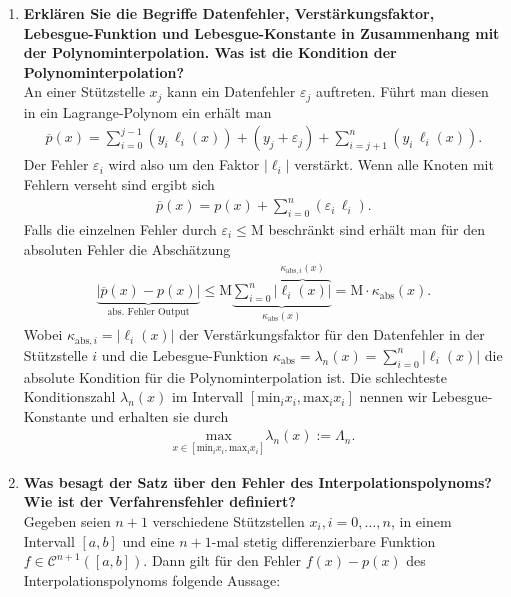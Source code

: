 \begin{enumerate}
		\item \textbf{Erklären Sie die Begriffe Datenfehler, Verstärkungsfaktor, Lebesgue-Funktion und Lebesgue-Konstante in Zusammenhang mit der Polynominterpolation. Was ist die Kondition der Polynominterpolation?} \\
			An einer Stützstelle \(x_j\) kann ein Datenfehler \(\varepsilon_j\) auftreten.
			Führt man diesen in ein Lagrange-Polynom ein erhält man
			\begin{align*}
				\overline{p}(x)=\sum_{i=0}^{j-1}\left( y_i\,\ell_i(x)\right) + (y_j+\varepsilon_j)+\sum_{i=j+1}^{n}\left( y_i\,\ell_i(x)\right).
			\end{align*}
			Der Fehler \(\varepsilon_i\) wird also um den Faktor \(|\ell_i|\) verstärkt.
			Wenn alle Knoten mit Fehlern verseht sind ergibt sich
			\begin{align*}
				\overline{p}(x)=p(x)+\sum_{i=0}^{n}\left( \varepsilon_i\,\ell_i \right) .
			\end{align*}
			Falls die einzelnen Fehler durch \(\varepsilon_i\le\text{M}\) beschränkt sind erhält man für den absoluten Fehler die Abschätzung
			\begin{align*}
				\underbrace{|\overline{p}(x)-p(x)|}_\text{abs. Fehler Output}\leq \text{M}\underbrace{\sum_{i=0}^{n}\overbrace{|\ell_i(x)|}^{\kappa_{\text{abs},i}(x)}}_{\kappa_\text{abs}(x)}
				= \text{M}\cdot\kappa_\text{abs}(x).
			\end{align*}
			Wobei \(\kappa_{\text{abs},i}=|\ell_i(x)|\) der Verstärkungsfaktor für den Datenfehler in der Stützstelle \(i\) und die Lebesgue-Funktion \(\kappa_\text{abs}=\lambda_n(x)=\sum_{i=0}^{n}|\ell_i(x)|\) die absolute Kondition für die Polynominterpolation ist. Die schlechteste Konditionszahl \(\lambda_n(x)\) im Intervall \([\text{min}_ix_i,\text{max}_ix_i]\) nennen wir Lebesgue-Konstante und erhalten sie durch
			\begin{align*}
				\underset{x\in[\text{min}_ix_i,\text{max}_ix_i]}{\text{max}} \lambda_n(x):=\Lambda_n.
			\end{align*}
		\item \textbf{Was besagt der Satz über den Fehler des Interpolationspolynoms? Wie ist der Verfahrensfehler definiert?} \\
			Gegeben seien \(n+1\) verschiedene Stützstellen \(x_i, i=0,\dots,n\), in einem Intervall \([a,b]\) und eine \(n+1\)-mal stetig differenzierbare Funktion \(f\in\mathscr{C}^{n+1}([a,b])\). Dann gilt für den Fehler \( f(x)-p(x) \) des Interpolationspolynoms folgende Aussage: \\

\end{enumerate}

